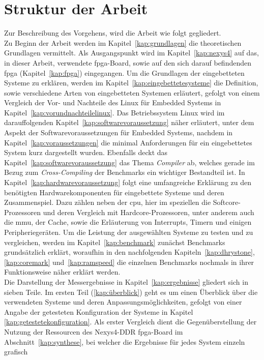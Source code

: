  \section{Struktur der Arbeit}\label{kap:strukturderarbeit}

Zur Beschreibung des Vorgehens, wird die Arbeit wie folgt gegliedert.\\
 Zu Beginn der Arbeit werden im Kapitel~\ref{kap:grundlagen} die theoretischen Grundlagen vermittelt. Als
Ausgangspunkt wird im Kapitel~\ref{kap:nexys4} auf das, in dieser Arbeit, verwendete \ac{fpga}-Board, sowie auf den sich darauf befindenden \ac{fpga} (Kapitel~\ref{kap:fpga}) eingegangen.
 Um die Grundlagen der eingebetteten Systeme zu erklären, werden im Kapitel~\ref{kap:eingebettetesysteme} die Definition, sowie verschiedene Arten von eingebetteten Systemen erläutert, gefolgt von
 einem Vergleich der Vor- und Nachteile des Linux für Embedded Systems in Kapitel~\ref{kap:vorundnachteilelinux}. Das Betriebssystem Linux wird im darauffolgenden Kapitel~\ref{kap:softwarevoraussetzung} näher
 erläutert, unter dem Aspekt der Softwarevoraussetzungen für Embedded Systems, nachdem in Kapitel~\ref{kap:voraussetzungen} die minimal Anforderungen für ein eingebettetes System kurz dargestellt wurden.
 Ebenfalls deckt das Kapitel~\ref{kap:softwarevoraussetzung} das Thema \emph{Compiler} ab, welches gerade im Bezug zum \emph{Cross-Compiling} der Benchmarks ein wichtiger Bestandteil ist.
 In Kapitel~\ref{kap:hardwarevoraussetzung} folgt eine umfangreiche Erklärung zu den benötigten Hardwarekomponenten für eingebettete Systeme und deren Zusammenspiel. Dazu zählen neben der \ac{cpu}, hier im speziellen die
 Softcore-Prozessoren und deren Vergleich mit Hardcore-Prozessoren, unter anderem auch die \ac{mmu}, der Cache, sowie die Erläuterung von Interrupts, Timern und einigen Peripheriegeräten. Um die Leistung
 der ausgewählten Systeme zu testen und zu vergleichen, werden im Kapitel~\ref{kap:benchmark} zunächst Benchmarks grundsätzlich erklärt, woraufhin in den nachfolgenden Kapiteln~\ref{kap:dhrystone},
\ref{kap:coremark} und~\ref{kap:ramspeed} die einzelnen Benchmarks nochmals in ihrer Funktionsweise näher erklärt werden.\\
Die Darstellung der Messergebnisse in Kapitel~\ref{kap:ergebnisse} gliedert sich in sieben Teile.
Im ersten Teil (\ref{kap:überblick}) geht es um einen Überblick über die verwendeten Systeme und deren Anpassungsmöglichkeiten, gefolgt von einer Angabe der getesteten Konfiguration der Systeme in Kapitel
\ref{kap:getestetekonfiguration}.
Als erster Vergleich dient die Gegenüberstellung der Nutzung der Ressourcen des Nexys4-DDR \ac{fpga}-Board im Abschnitt~\ref{kap:synthese}, bei welcher die Ergebnisse für jedes System einzeln grafisch
